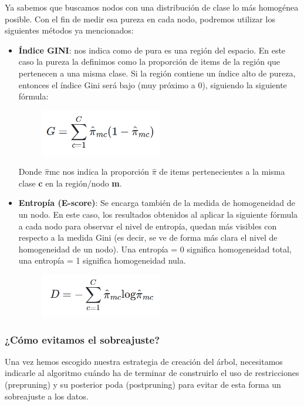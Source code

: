 Ya sabemos que buscamos nodos con una distribución de clase lo más homogénea posible. Con el fin de medir esa pureza en cada nodo, podremos utilizar los siguientes métodos ya mencionados:
\begin{itemize}
	\item \textbf{Índice GINI}: nos indica como de pura es una región del espacio\cite{ref8}. En este caso la pureza la definimos como la proporción de items de la región que pertenecen a una misma clase. Si la región contiene un índice
	alto de pureza, entonces el índice Gini será bajo (muy próximo a 0), siguiendo la siguiente fórmula:
	\begin{figure}[H]
		\centering
		\includegraphics[width=0.5\textwidth]{imagenes/gini} 
	\end{figure}
	Donde $\widehat{\pi}$mc nos indica la proporción \textbf{$\widehat{\pi}$} de items pertenecientes a la misma clase \textbf{c} en la región/nodo \textbf{m}.
	\item \textbf{Entropía (E-score)}: Se encarga también de la medida de homogeneidad de un nodo\cite{ref8}. En este caso, los resultados obtenidos al aplicar la siguiente fórmula a cada nodo para observar el nivel de entropía, quedan más visibles con respecto a la medida Gini (es decir, se ve de forma más clara el nivel de homogeneidad de un nodo). Una entropía = 0 significa homogeneidad total, una entropía = 1 significa homogeneidad nula.
	\begin{figure}[H]
		\centering
		\includegraphics[width=0.5\textwidth]{imagenes/entropia} 
	\end{figure}
\end{itemize}

\subsubsection{¿Cómo evitamos el sobreajuste?}

Una vez hemos escogido nuestra estrategia de creación del árbol, necesitamos indicarle al algoritmo cuándo ha de terminar de construirlo el uso de restricciones (prepruning) y su posterior poda (postpruning) para evitar de esta forma un sobreajuste a los datos.\\

